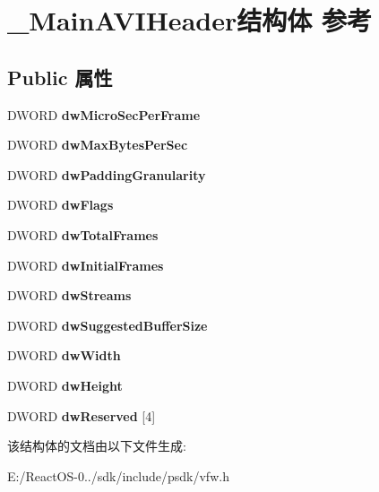 \hypertarget{struct___main_a_v_i_header}{}\section{\+\_\+\+Main\+A\+V\+I\+Header结构体 参考}
\label{struct___main_a_v_i_header}
\subsection*{Public 属性}
\begin{DoxyCompactItemize}
\item 
\mbox{\label{struct___main_a_v_i_header_ab559c123136ddeb583ef0d6cc9cbf894}} 
D\+W\+O\+RD {\bfseries dw\+Micro\+Sec\+Per\+Frame}
\item 
\mbox{\label{struct___main_a_v_i_header_a8cee7094d7027d779dda5601979e0a07}} 
D\+W\+O\+RD {\bfseries dw\+Max\+Bytes\+Per\+Sec}
\item 
\mbox{\label{struct___main_a_v_i_header_a2f60b18cc8de30241da133deb4fa8dce}} 
D\+W\+O\+RD {\bfseries dw\+Padding\+Granularity}
\item 
\mbox{\label{struct___main_a_v_i_header_aa394b267aacef0b36f941b8fbbe4b90c}} 
D\+W\+O\+RD {\bfseries dw\+Flags}
\item 
\mbox{\label{struct___main_a_v_i_header_ac263ada960179a3d3f0c121e0e086660}} 
D\+W\+O\+RD {\bfseries dw\+Total\+Frames}
\item 
\mbox{\label{struct___main_a_v_i_header_aa267f6d5993bb8807fa20ab4786c4c5f}} 
D\+W\+O\+RD {\bfseries dw\+Initial\+Frames}
\item 
\mbox{\label{struct___main_a_v_i_header_a7006bac2df68337e012e7e666de944c4}} 
D\+W\+O\+RD {\bfseries dw\+Streams}
\item 
\mbox{\label{struct___main_a_v_i_header_a196bdd9a8b0f5cfff63b22143802b537}} 
D\+W\+O\+RD {\bfseries dw\+Suggested\+Buffer\+Size}
\item 
\mbox{\label{struct___main_a_v_i_header_a070dbee03fcf8df06647de7cb03e6767}} 
D\+W\+O\+RD {\bfseries dw\+Width}
\item 
\mbox{\label{struct___main_a_v_i_header_a29bead98ad9c217db7d4cd1294c37620}} 
D\+W\+O\+RD {\bfseries dw\+Height}
\item 
\mbox{\label{struct___main_a_v_i_header_ad0ba8a7b62e90c0d37aadcc488624d37}} 
D\+W\+O\+RD {\bfseries dw\+Reserved} \mbox{[}4\mbox{]}
\end{DoxyCompactItemize}


该结构体的文档由以下文件生成\+:\begin{DoxyCompactItemize}
\item 
E\+:/\+React\+O\+S-\/0../sdk/include/psdk/vfw.\+h\end{DoxyCompactItemize}
